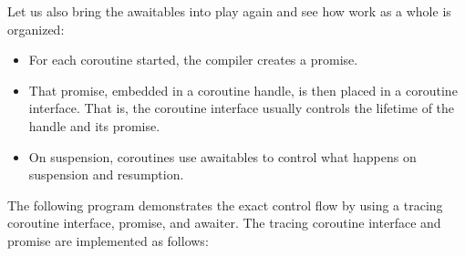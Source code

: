 
Let us also bring the awaitables into play again and see how work as a whole is organized:

\begin{itemize}
\item 
For each coroutine started, the compiler creates a promise.

\item 
That promise, embedded in a coroutine handle, is then placed in a coroutine interface. That is, the coroutine interface usually controls the lifetime of the handle and its promise.

\item 
On suspension, coroutines use awaitables to control what happens on suspension and resumption.
\end{itemize}

The following program demonstrates the exact control flow by using a tracing coroutine interface, promise, and awaiter. The tracing coroutine interface and promise are implemented as follows:


